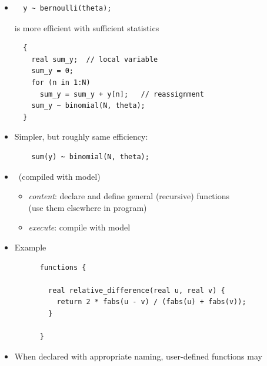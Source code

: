 \documentclass[10pt]{report}
\begin{document}
%
\begin{itemize}
\item
\begin{Verbatim}
  y ~ bernoulli(theta);
\end{Verbatim}
is more efficient with sufficient statistics
{\small
\begin{Verbatim}
  {
    real sum_y;  // local variable
    sum_y = 0;
    for (n in 1:N)
      sum_y = sum_y + y[n];   // reassignment
    sum_y ~ binomial(N, theta);
  }
\end{Verbatim}
}
\item Simpler, but roughly same efficiency:
\begin{Verbatim}
    sum(y) ~ binomial(N, theta);
\end{Verbatim}
\end{itemize}


%
\begin{itemize}
\item {} \ (compiled with model)
  \vspace*{-4pt}
  \begin{itemize}\small
  \item {\slshape content}: declare and define general (recursive) functions
    \\
    {\small (use them elsewhere in program)}
  \item {\slshape execute}: compile with model
  \end{itemize}
  \vspace*{6pt}
\item Example
  \\[6pt]
  \begin{minipage}[t]{0.8\textwidth}
    \footnotesize
    \begin{Verbatim}
      functions {

        real relative_difference(real u, real v) {
          return 2 * fabs(u - v) / (fabs(u) + fabs(v));
        }

      }
    \end{Verbatim}
  \end{minipage}
\end{itemize}

%
\begin{itemize}
\item When declared with appropriate naming, user-defined functions
  may
\end{itemize}
\end{document}
